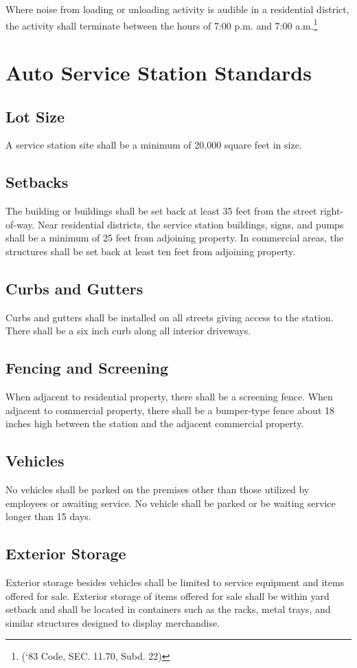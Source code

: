 \subsubsection{}
Where noise from loading or unloading activity is audible in a residential district, the activity shall terminate between the hours of 7:00 p.m. and 7:00 a.m.\footnote{(‘83 Code, SEC. 11.70, Subd. 22)}

\section{Auto Service Station Standards}
\subsection{Lot Size}
A service station site shall be a minimum of 20,000 square feet in size.
\subsection{Setbacks}
The building or buildings shall be set back at least 35 feet from the street right-of-way. Near residential districts, the service station buildings, signs, and pumps shall be a minimum of 25 feet from adjoining property. In commercial areas, the structures shall be set back at least ten feet from adjoining property.
\subsection{Curbs and Gutters}
Curbs and gutters shall be installed on all streets giving access to the station. There shall be a six inch curb along all interior driveways.
\subsection{Fencing and Screening}
When adjacent to residential property, there shall be a screening fence. When adjacent to commercial property, there shall be a bumper-type fence about 18 inches high between the station and the adjacent commercial property.
\subsection{Vehicles}
No vehicles shall be parked on the premises other than those utilized by employees or awaiting service. No vehicle shall be parked or be waiting service longer than 15 days.
\subsection{Exterior Storage}
Exterior storage besides vehicles shall be limited to service equipment and items offered for sale. Exterior storage of items offered for sale shall be within yard setback and shall be located in containers such as the racks, metal trays, and similar structures designed to display merchandise.
